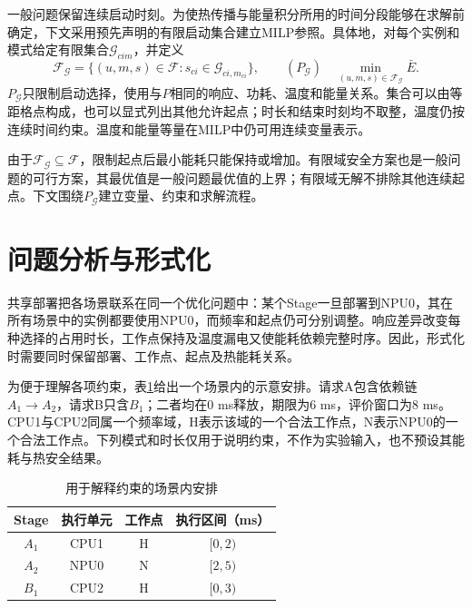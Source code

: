 一般问题保留连续启动时刻。为使热传播与能量积分所用的时间分段能够在求解前确定，下文采用预先声明的有限启动集合建立MILP参照。具体地，对每个实例和模式给定有限集合\(\mathcal G_{cim}\)，并定义
\begin{equation}
\mathcal F_{\mathcal G}=\{(u,m,s)\in\mathcal F:
s_{ci}\in\mathcal G_{ci,m_{ci}}\},\qquad
(P_{\mathcal G})\quad\min_{(u,m,s)\in\mathcal F_{\mathcal G}}\bar E.
\label{eq:finite-start-problem}
\end{equation}
\(P_{\mathcal G}\)只限制启动选择，使用与\(P\)相同的响应、功耗、温度和能量关系。集合可以由等距格点构成，也可以显式列出其他允许起点；时长和结束时刻均不取整，温度仍按连续时间约束。温度和能量等量在MILP中仍可用连续变量表示。

由于\(\mathcal F_{\mathcal G}\subseteq\mathcal F\)，限制起点后最小能耗只能保持或增加。有限域安全方案也是一般问题的可行方案，其最优值是一般问题最优值的上界；有限域无解不排除其他连续起点。下文围绕\(P_{\mathcal G}\)建立变量、约束和求解流程。

\section{问题分析与形式化}

共享部署把各场景联系在同一个优化问题中：某个Stage一旦部署到NPU0，其在所有场景中的实例都要使用NPU0，而频率和起点仍可分别调整。响应差异改变每种选择的占用时长，工作点保持及温度漏电又使能耗依赖完整时序。因此，形式化时需要同时保留部署、工作点、起点及热能耗关系。

为便于理解各项约束，表\ref{tab:constraint-example}给出一个场景内的示意安排。请求A包含依赖链\(A_1\rightarrow A_2\)，请求B只含\(B_1\)；二者均在0 ms释放，期限为6 ms，评价窗口为8 ms。CPU1与CPU2同属一个频率域，H表示该域的一个合法工作点，N表示NPU0的一个合法工作点。下列模式和时长仅用于说明约束，不作为实验输入，也不预设其能耗与热安全结果。

\begin{table}[htbp]
\centering
\caption{用于解释约束的场景内安排}
\label{tab:constraint-example}
\begin{tabular}{cccc}
\toprule
Stage & 执行单元 & 工作点 & 执行区间（ms） \\
\midrule
\(A_1\) & CPU1 & H & $[0,2)$ \\
\(A_2\) & NPU0 & N & $[2,5)$ \\
\(B_1\) & CPU2 & H & $[0,3)$ \\
\bottomrule
\end{tabular}
\end{table}

